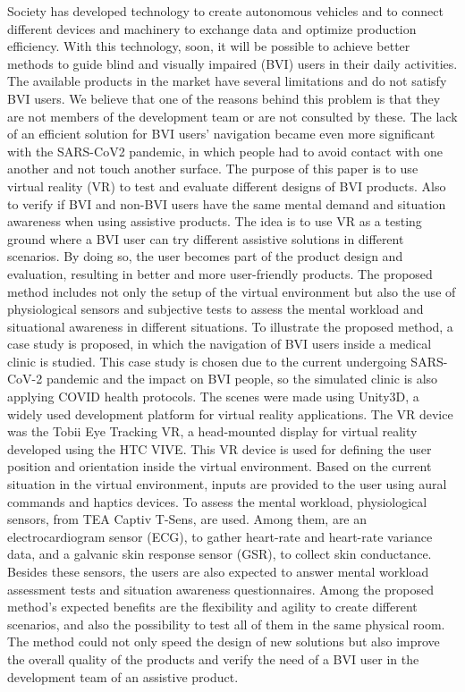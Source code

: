 Society has developed technology to create autonomous vehicles and to connect different devices and machinery to exchange data and optimize production efficiency.  With this technology, soon, it will be possible to achieve better methods to guide blind and visually impaired (BVI) users in their daily activities. The available products in the market have several limitations and do not satisfy BVI users. We believe that one of the reasons behind this problem is that they are not members of the development team or are not consulted by these. 
The lack of an efficient solution for BVI users' navigation became even more significant with the SARS-CoV2 pandemic, in which people had to avoid contact with one another and not touch another surface.
The purpose of this paper is to use virtual reality (VR) to test and evaluate different designs of BVI products. Also to verify if BVI and non-BVI users have the same mental demand and situation awareness when using assistive products. The idea is to use VR as a testing ground where a BVI user can try different assistive solutions in different scenarios. By doing so, the user becomes part of the product design and evaluation, resulting in better and more user-friendly products. The proposed method includes not only the setup of the virtual environment but also the use of physiological sensors and subjective tests to assess the mental workload and situational awareness in different situations.
To illustrate the proposed method, a case study is proposed, in which the navigation of BVI users inside a medical clinic is studied. This case study is chosen due to the current undergoing SARS-CoV-2 pandemic and the impact on BVI people, so the simulated clinic is also applying COVID health protocols.
The scenes were made using Unity3D, a widely used development platform for virtual reality applications. The VR device was the Tobii Eye Tracking VR, a head-mounted display for virtual reality developed using the HTC VIVE. This VR device is used for defining the user position and orientation inside the virtual environment. Based on the current situation in the virtual environment, inputs are provided to the user using aural commands and haptics devices. To assess the mental workload, physiological sensors, from TEA Captiv T-Sens, are used. Among them, are an electrocardiogram sensor (ECG), to gather heart-rate and heart-rate variance data, and a galvanic skin response sensor (GSR), to collect skin conductance. Besides these sensors, the users are also expected to answer mental workload assessment tests and situation awareness questionnaires.
Among the proposed method's expected benefits are the flexibility and agility to create different scenarios, and also the possibility to test all of them in the same physical room. The method could not only speed the design of new solutions but also improve the overall quality of the products and verify the need of a BVI user in the development team of an assistive product.